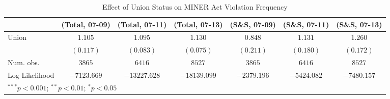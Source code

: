 
\begin{table}[H]
\begin{center}
\begin{tabular}{l c c c c c c}
\hline
 & (Total, 07-09) & (Total, 07-11) & (Total, 07-13) & (S\&S, 07-09) & (S\&S, 07-11) & (S\&S, 07-13) \\
\hline
Union          & $1.105$     & $1.095$      & $1.130$      & $0.848$     & $1.131$     & $1.260$     \\
               & $(0.117)$   & $(0.083)$    & $(0.075)$    & $(0.211)$   & $(0.180)$   & $(0.172)$   \\
\hline
Num. obs.      & $3865$      & $6416$       & $8527$       & $3865$      & $6416$      & $8527$      \\
Log Likelihood & $-7123.669$ & $-13227.628$ & $-18139.099$ & $-2379.196$ & $-5424.082$ & $-7480.157$ \\
\hline
\multicolumn{7}{l}{\scriptsize{$^{***}p<0.001$; $^{**}p<0.01$; $^{*}p<0.05$}}
\end{tabular}
\caption{Effect of Union Status on MINER Act Violation Frequency}
\label{irr_100employees_mineract_violations}
\end{center}
\end{table}

